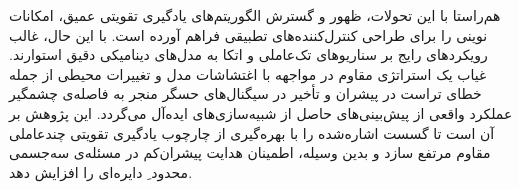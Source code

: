 هم‌راستا با این تحولات، ظهور و گسترش الگوریتم‌های یادگیری تقویتی عمیق، امکانات نوینی را برای طراحی کنترل‌کننده‌های تطبیقی فراهم آورده است. با این حال، غالب رویکردهای رایج بر سناریوهای تک‌عاملی و اتکا به مدل‌های دینامیکی دقیق استوارند. غیاب یک استراتژی مقاوم در مواجهه با اغتشاشات مدل و تغییرات محیطی از جمله خطای تراست در پیشران‌ و تأخیر در سیگنال‌های حسگر منجر به فاصله‌ی چشمگیر عملکرد واقعی از پیش‌بینی‌های حاصل از شبیه‌سازی‌های ایده‌آل می‌گردد. این پژوهش بر آن است تا گسست اشاره‌شده را با بهره‌گیری از چارچوب یادگیری تقویتی چندعاملی مقاوم مرتفع سازد و بدین وسیله، اطمینان هدایت پیشران‌کم در
 مسئله‌ی سه‌جسمی محدود ِ دایره‌ای 
 را افزایش دهد.